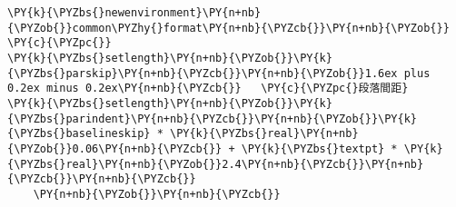 \begin{Verbatim}[commandchars=\\\{\}]
\PY{k}{\PYZbs{}newenvironment}\PY{n+nb}{\PYZob{}}common\PYZhy{}format\PY{n+nb}{\PYZcb{}}\PY{n+nb}{\PYZob{}} \PY{c}{\PYZpc{}}
\PY{k}{\PYZbs{}setlength}\PY{n+nb}{\PYZob{}}\PY{k}{\PYZbs{}parskip}\PY{n+nb}{\PYZcb{}}\PY{n+nb}{\PYZob{}}1.6ex plus 0.2ex minus 0.2ex\PY{n+nb}{\PYZcb{}}   \PY{c}{\PYZpc{}段落間距}
\PY{k}{\PYZbs{}setlength}\PY{n+nb}{\PYZob{}}\PY{k}{\PYZbs{}parindent}\PY{n+nb}{\PYZcb{}}\PY{n+nb}{\PYZob{}}\PY{k}{\PYZbs{}baselineskip} * \PY{k}{\PYZbs{}real}\PY{n+nb}{\PYZob{}}0.06\PY{n+nb}{\PYZcb{}} + \PY{k}{\PYZbs{}textpt} * \PY{k}{\PYZbs{}real}\PY{n+nb}{\PYZob{}}2.4\PY{n+nb}{\PYZcb{}}\PY{n+nb}{\PYZcb{}}\PY{n+nb}{\PYZcb{}}
    \PY{n+nb}{\PYZob{}}\PY{n+nb}{\PYZcb{}}
\end{Verbatim}
